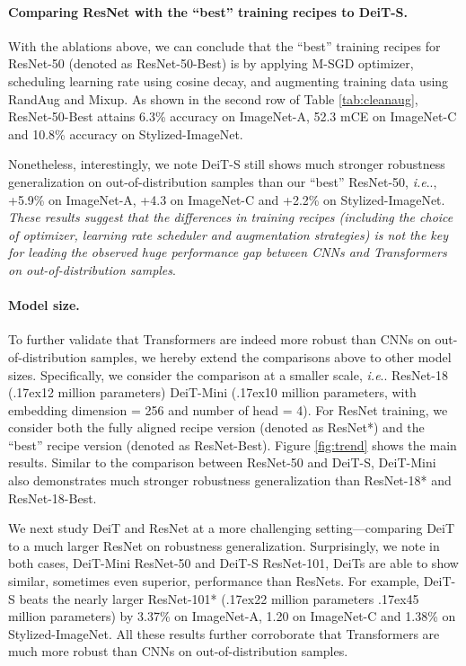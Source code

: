 \documentclass{article}
\makeatletter
\def\vs{{\bm{s}}}
\newcommand{\app}{\raise.17ex\hbox{}}
\DeclareRobustCommand\onedot{\futurelet\@let@token\@onedot}
\def\@onedot{\ifx\@let@token.\else.\null\fi\xspace}
\def\ie{\emph{i.e}\onedot} \def\Ie{\emph{I.e}\onedot}
\makeatother
\begin{document}
\paragraph{Comparing ResNet with the ``best'' training recipes to DeiT-S.}
With the ablations above, we can conclude that the ``best'' training recipes for ResNet-50 (denoted as ResNet-50-Best) is by applying M-SGD optimizer, scheduling learning rate using cosine decay, and augmenting training data using RandAug and Mixup. As shown in the second row of Table \ref{tab:cleanaug}, ResNet-50-Best attains 6.3\% accuracy on ImageNet-A, 52.3 mCE on ImageNet-C and 10.8\% accuracy on Stylized-ImageNet.

Nonetheless, interestingly, we note DeiT-S still shows much stronger robustness generalization on out-of-distribution samples than our ``best'' ResNet-50, \ie,  +5.9\% on ImageNet-A, +4.3 on ImageNet-C and +2.2\% on Stylized-ImageNet. \emph{These results suggest that the differences in training recipes (including the choice of optimizer, learning rate scheduler and augmentation strategies) is not the key for leading the observed huge performance gap between CNNs and Transformers on out-of-distribution samples}. 

\paragraph{Model size.}  
To further validate that Transformers are indeed more robust than CNNs on out-of-distribution samples, we hereby extend the comparisons above to other model sizes. Specifically, we consider the comparison at a smaller scale, \ie ResNet-18 (\app12 million parameters) \vs DeiT-Mini (\app 10 million parameters, with embedding dimension = 256 and number of head = 4). For ResNet training, we consider both the fully aligned recipe version (denoted as ResNet*) and the ``best'' recipe version (denoted as ResNet-Best). Figure \ref{fig:trend}  shows the main results. Similar to the comparison between ResNet-50 and DeiT-S, DeiT-Mini also demonstrates much stronger robustness generalization than ResNet-18* and ResNet-18-Best. 

We next study DeiT and ResNet at a more challenging setting---comparing DeiT to a much larger ResNet on robustness generalization. Surprisingly, we note in both cases, DeiT-Mini \vs ResNet-50 and DeiT-S \vs ResNet-101, DeiTs are able to show similar, sometimes even superior, performance than ResNets. For example, DeiT-S beats the nearly  larger ResNet-101* (\app22 million parameters \vs \app45 million parameters) by 3.37\% on ImageNet-A, 1.20 on ImageNet-C and 1.38\% on Stylized-ImageNet. All these results further corroborate that Transformers are much more robust than CNNs on out-of-distribution samples. 
\end{document}
